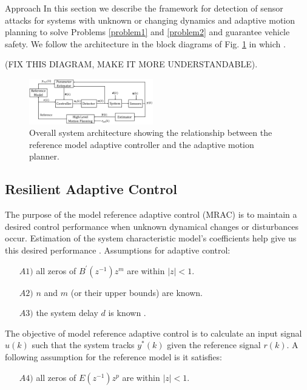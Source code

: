 
\begin{section}{Approach}
\label{sec:approach}
In this section we describe the framework for detection of sensor attacks for systems with unknown or changing dynamics and adaptive motion planning to solve Problems \ref{problem1} and \ref{problem2} and guarantee vehicle safety. We follow the architecture in the block diagrams of Fig. \ref{fig:system_arch} in which .


(FIX THIS DIAGRAM, MAKE IT MORE UNDERSTANDABLE).
\begin{figure}[ht!]
\vspace{1pt}
\centering
\includegraphics[width=0.48\textwidth]{sys_arch.png}
\caption{Overall system architecture showing the relationship between the reference model adaptive controller and the adaptive motion planner.}
\label{fig:system_arch}
\end{figure}

\subsection{Resilient Adaptive Control}
\label{sec:Res_adapt_control}

The purpose of the model reference adaptive control (MRAC) is to maintain a desired control performance when unknown dynamical changes or disturbances occur. Estimation of the system characteristic model's coefficients help give us this desired performance .
Assumptions for adaptive control:
	\begin{enumerate}[leftmargin=4\parindent]
	\item[$A1)$] all zeros of $B^{'}(z^{-1})z^m$ are within $|z|<1$. 
	\item[$A2)$] $n$ and $m$ (or their upper bounds) are known. 
	\item[$A3)$] the system delay $d$ is known  .
	\end{enumerate}
The objective of model reference adaptive control is to calculate an input signal $u(k)$ such that the system tracks $y^{*}(k)$  given the reference signal $r(k)$. 
A following assumption for the reference model is it satisfies:
    \begin{enumerate}[leftmargin=4\parindent]
	\item[$A4)$] all zeros of $E(z^{-1})z^p$ are within $|z|<1$. 
	\end{enumerate}


\end{section}
